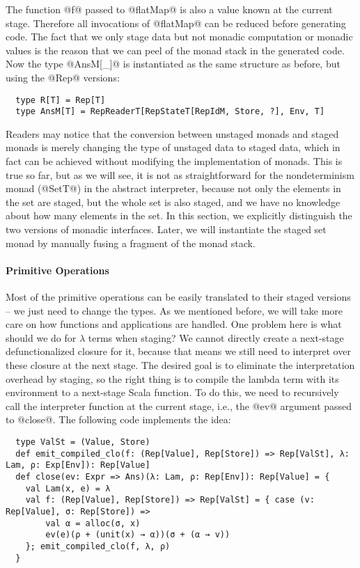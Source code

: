 The function @f@ passed to @flatMap@ is also a value known at the current stage.
Therefore all invocations of @flatMap@ can be reduced before generating code.
The fact that we only stage data but not monadic computation or monadic
values is the reason that we can peel of the monad stack in the generated code.
Now the type @AnsM[_]@ is instantiated as the same structure as before, but using the
@Rep@ versions:
\begin{lstlisting}
  type R[T] = Rep[T]
  type AnsM[T] = RepReaderT[RepStateT[RepIdM, Store, ?], Env, T]
\end{lstlisting}

Readers may notice that the conversion between unstaged monads and staged monads
is merely changing the type of unstaged data to staged data, which in fact can
be achieved without modifying the implementation of monads. This is true so far,
but as we will see, it is not as straightforward for the nondeterminism monad
(@SetT@) in the abstract interpreter, because not only the elements in the set are
staged, but the whole set is also staged, and we have no knowledge about how
many elements in the set. In this section, we explicitly distinguish the two
versions of monadic interfaces. Later, we will instantiate the staged set monad
by manually fusing a fragment of the monad stack.

\paragraph{Primitive Operations} Most of the primitive operations can be easily
translated to their staged versions -- we just need to change the types.
As we mentioned before, we will take more care on how functions and
applications are handled.  One problem here is what should we do for
$\lambda$ terms when staging? We cannot directly create a next-stage
defunctionalized closure for it, because that means we still need to
interpret over these closure at the next stage.  The desired goal is to
eliminate the interpretation overhead by staging, so the right thing is to
compile the lambda term with its environment to a next-stage Scala function. To
do this, we need to recursively call the interpreter function at the current stage,
i.e., the @ev@ argument passed to @close@.  The following code implements the
idea:
\begin{lstlisting}
  type ValSt = (Value, Store)
  def emit_compiled_clo(f: (Rep[Value], Rep[Store]) => Rep[ValSt], λ: Lam, ρ: Exp[Env]): Rep[Value]
  def close(ev: Expr => Ans)(λ: Lam, ρ: Rep[Env]): Rep[Value] = {
    val Lam(x, e) = λ
    val f: (Rep[Value], Rep[Store]) => Rep[ValSt] = { case (v: Rep[Value], σ: Rep[Store]) =>
        val α = alloc(σ, x)
        ev(e)(ρ + (unit(x) → α))(σ + (α → v))
    }; emit_compiled_clo(f, λ, ρ)
  }
\end{lstlisting}


